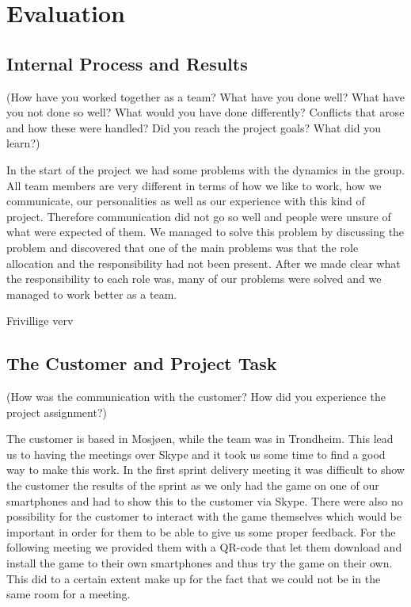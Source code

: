 \section{Evaluation}


\subsection{Internal Process and Results}

	(How have you worked together as a team? What have you done 
	well? What have you not done so well? What would you have done differently? Conflicts that 
	arose and how these were handled? Did you reach the project goals? What did you learn?)

	In the start of the project we had some problems with the dynamics in the group. All team members are very different in terms of how we like to work, how we communicate, our personalities as well as our experience with this kind of project. Therefore communication did not go so well and people were unsure of what were expected of them. We managed to solve this problem by discussing the problem and discovered that one of the main problems was that the role allocation and the responsibility had not been present. After we made clear what the responsibility to each role was, many of our problems were solved and we managed to work better as a team.

	Frivillige verv


\subsection{The Customer and Project Task}

	(How was the communication with the customer? How did you 
	experience the project assignment?)

	The customer is based in Mosjøen, while the team was in Trondheim. This lead us to having the meetings over Skype and it took us some time to find a good way to make this work. In the first sprint delivery meeting it was difficult to show the customer the results of the sprint as we only had the game on one of our smartphones and had to show this to the customer via Skype. There were also no possibility for the customer to interact with the game themselves which would be important in order for them to be able to give us some proper feedback. For the following meeting we provided them with a QR-code that let them download and install the game to their own smartphones and thus try the game on their own. This did to a certain extent make up for the fact that we could not be in the same room for a meeting.

